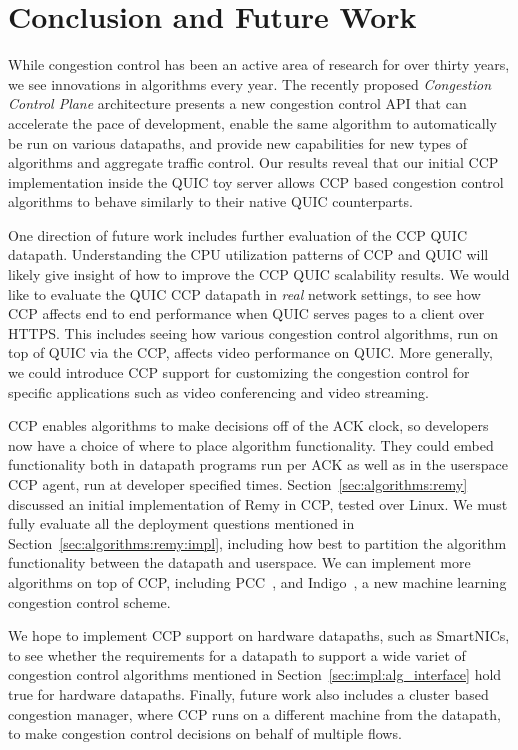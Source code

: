 \chapter{Conclusion and Future Work}
While congestion control has been an active area of research for over thirty years, we see innovations in algorithms every year.
The recently proposed \textit{Congestion Control Plane} architecture presents a new congestion control API that can accelerate the pace of development, enable the same algorithm to automatically be run on various datapaths, and provide new capabilities for new types of algorithms and aggregate traffic control.
Our results reveal that our initial CCP implementation inside the QUIC toy server allows CCP based congestion control algorithms to behave similarly to their native QUIC counterparts.

One direction of future work includes further evaluation of the CCP QUIC datapath.
Understanding the CPU utilization patterns of CCP and QUIC will likely give insight of how to improve the CCP QUIC scalability results.
We would like to evaluate the QUIC CCP datapath in \textit{real} network settings, to see how CCP affects end to end performance when QUIC serves pages to a client over HTTPS.
This includes seeing how various congestion control algorithms, run on top of QUIC via the CCP, affects video performance on QUIC.
More generally, we could introduce CCP support for customizing the congestion control for specific applications such as video conferencing and video streaming.

CCP enables algorithms to make decisions off of the ACK clock, so developers now have a choice of where to place algorithm functionality.
They could embed functionality both in datapath programs run per ACK as well as in the userspace CCP agent, run at developer specified times.
Section~\ref{sec:algorithms:remy} discussed an initial implementation of Remy in CCP, tested over Linux.
We must fully evaluate all the deployment questions mentioned in Section~\ref{sec:algorithms:remy:impl}, including how best to partition the algorithm functionality between the datapath and userspace.
We can implement more algorithms on top of CCP, including PCC~\cite{pcc}, and Indigo~\cite{indigo}, a new machine learning congestion control scheme.

We hope to implement CCP support on hardware datapaths, such as SmartNICs, to see whether the requirements for a datapath to support a wide variet of congestion control algorithms mentioned in Section~\ref{sec:impl:alg_interface} hold true for hardware datapaths.
Finally, future work also includes a cluster based congestion manager, where CCP runs on a different machine from the datapath, to make congestion control decisions on behalf of multiple flows.

